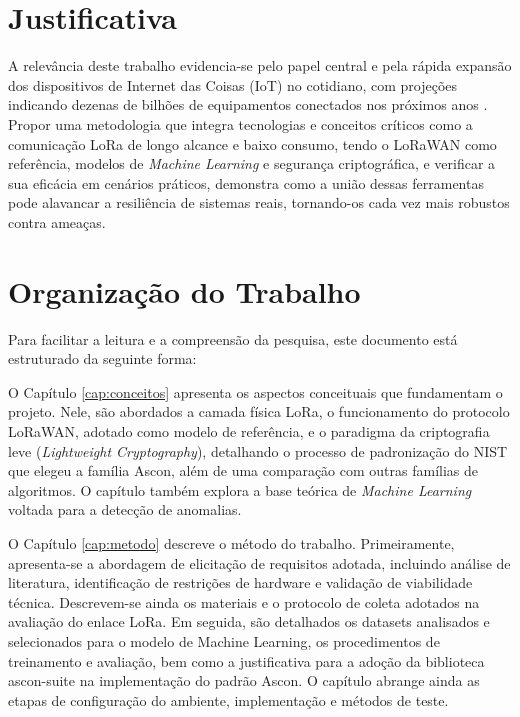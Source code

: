 
\section{Justificativa}
A relevância deste trabalho evidencia-se pelo papel central e pela rápida expansão dos dispositivos de Internet das Coisas (IoT) no cotidiano, com projeções indicando dezenas de bilhões de equipamentos conectados nos próximos anos \cite{ericsson2026mobility}. Propor uma metodologia que integra tecnologias e conceitos críticos como a comunicação LoRa de longo alcance e baixo consumo, tendo o LoRaWAN como referência, modelos de \textit{Machine Learning} e segurança criptográfica, e verificar a sua eficácia em cenários práticos, demonstra como a união dessas ferramentas pode alavancar a resiliência de sistemas reais, tornando-os cada vez mais robustos contra ameaças.


\section{Organização do Trabalho}
Para facilitar a leitura e a compreensão da pesquisa, este documento está estruturado da seguinte forma:

O Capítulo \ref{cap:conceitos} apresenta os aspectos conceituais que fundamentam o projeto. Nele, são abordados a camada física LoRa, o funcionamento do protocolo LoRaWAN, adotado como modelo de referência, e o paradigma da criptografia leve (\textit{Lightweight Cryptography}), detalhando o processo de padronização do NIST que elegeu a família Ascon, além de uma comparação com outras famílias de algoritmos. O capítulo também explora a base teórica de \textit{Machine Learning} voltada para a detecção de anomalias.

O Capítulo \ref{cap:metodo} descreve o método do trabalho. Primeiramente, apresenta-se a abordagem de elicitação de requisitos adotada, incluindo análise de literatura, identificação de restrições de hardware e validação de viabilidade técnica. Descrevem-se ainda os materiais e o protocolo de coleta adotados na avaliação do enlace LoRa. Em seguida, são detalhados os datasets analisados e selecionados para o modelo de Machine Learning, os procedimentos de treinamento e avaliação, bem como a justificativa para a adoção da biblioteca ascon-suite na implementação do padrão Ascon. O capítulo abrange 
ainda as etapas de configuração do ambiente, implementação e métodos de teste.

